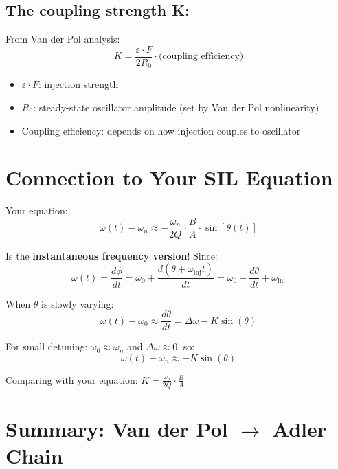 \documentclass{article}
\begin{document}
\subsection{The coupling strength K:}

From Van der Pol analysis:
\begin{equation}
K = \frac{\varepsilon \cdot F}{2R_0} \cdot \text{(coupling efficiency)}
\end{equation}

\begin{itemize}
    \item $\varepsilon \cdot F$: injection strength
    \item $R_0$: steady-state oscillator amplitude (set by Van der Pol nonlinearity)
    \item Coupling efficiency: depends on how injection couples to oscillator
\end{itemize}

\section{Connection to Your SIL Equation}

Your equation:
\begin{equation}
\omega(t) - \omega_n \approx -\frac{\omega_n}{2Q} \cdot \frac{B}{A} \cdot \sin[\theta(t)]
\end{equation}

Is the \textbf{instantaneous frequency version}! Since:
\begin{equation}
\omega(t) = \frac{d\phi}{dt} = \omega_0 + \frac{d(\theta + \omega_{\text{inj}}t)}{dt} = \omega_0 + \frac{d\theta}{dt} + \omega_{\text{inj}}
\end{equation}

When $\theta$ is slowly varying:
\begin{equation}
\omega(t) - \omega_0 \approx \frac{d\theta}{dt} = \Delta\omega - K \sin(\theta)
\end{equation}

For small detuning: $\omega_0 \approx \omega_n$ and $\Delta\omega \approx 0$, so:
\begin{equation}
\omega(t) - \omega_n \approx -K \sin(\theta)
\end{equation}

Comparing with your equation: $K = \frac{\omega_n}{2Q} \cdot \frac{B}{A}$

\section{Summary: Van der Pol $\rightarrow$ Adler Chain}
\end{document}
